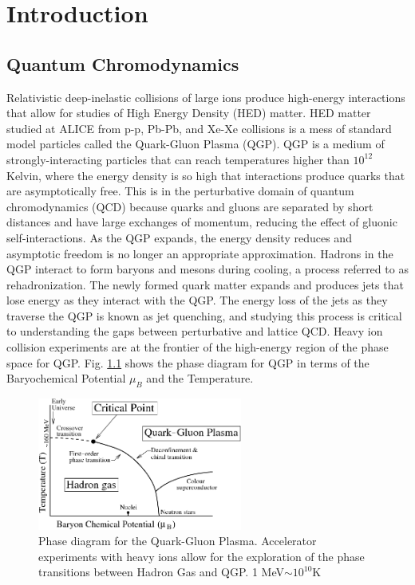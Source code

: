 \chapter{Introduction}

\section{Quantum Chromodynamics}
Relativistic deep-inelastic collisions of large ions produce high-energy interactions that allow for studies of High Energy Density (HED) matter. HED matter studied at ALICE from p-p, Pb-Pb, and Xe-Xe collisions is a mess of standard model particles called the Quark-Gluon Plasma (QGP). QGP is a medium of strongly-interacting particles that can reach temperatures higher than $10^{12}$ Kelvin, where the energy density is so high that interactions produce quarks that are asymptotically free. This is in the perturbative domain of quantum chromodynamics (QCD) because quarks and gluons are separated by short distances and have large exchanges of momentum, reducing the effect of gluonic self-interactions.
As the QGP expands, the energy density reduces and asymptotic freedom is no longer an appropriate approximation. Hadrons in the QGP interact to form baryons and mesons during cooling, a process referred to as rehadronization. The newly formed quark matter expands and produces jets that lose energy as they interact with the QGP. The energy loss of the jets as they traverse the QGP is known as jet quenching, and studying this process is critical to understanding the gaps between perturbative and lattice QCD. Heavy ion collision experiments are at the frontier of the high-energy region of the phase space for QGP. Fig. \ref{fig:QGP_Phase_Diagram} shows the phase diagram for QGP in terms of the Baryochemical Potential $\mu_B$ and the Temperature. 

\begin{figure}
    \centering
    \includegraphics[width=0.6\textwidth]{figures/ALICE/QGP_Phase_Diagram.png}
    \caption{Phase diagram for the Quark-Gluon Plasma. Accelerator experiments with heavy ions allow for the exploration of the phase transitions between Hadron Gas and QGP. 1 MeV$\sim 10^{10}$K 
    \cite{QCDPhaseDiagram}}
    \label{fig:QGP_Phase_Diagram}
\end{figure}


